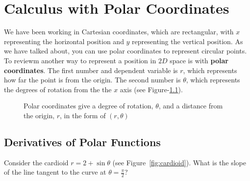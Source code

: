 \chapter{Calculus with Polar Coordinates}

We have been working in Cartesian coordinates, which are rectangular, with $x$ 
representing the horizontal position and $y$ representing the vertical 
position. As we have talked about, you can use polar coordinates to represent circular points. To reviewm another way to represent a position in $2D$ space is with \textbf{
polar coordinates}. The 
first number and dependent variable is $r$, which represents how 
far the point is from the origin. The second number is $\theta$, which represents the degrees 
of rotation from the the $x$ axis (see Figure-\ref{fig:polarex}). 

\begin{figure}[htbp]
\centering
    \caption{Polar coordinates give a degree of rotation, $\theta$, and a 
    distance from the origin, $r$, in the form of $(r, \theta)$}
    \label{fig:polarex}
    \end{figure}

\section{Derivatives of Polar Functions}
Consider the cardioid $r = 2 + \sin{\theta}$ (see Figure~\ref{fig:cardioid}). What 
is the slope of the line tangent to the curve at $\theta = \frac{\pi}{2}$? 


